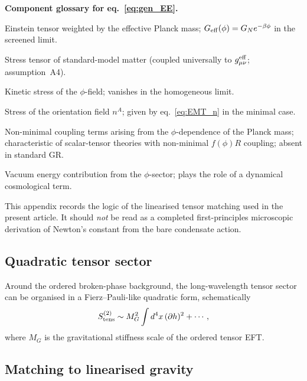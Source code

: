 \documentclass[11pt,a4paper]{article}
\numberwithin{equation}{section}
\begin{document}
\textbf{Component glossary for eq.~\eqref{eq:gen_EE}.}
\begin{description}[noitemsep,leftmargin=2.5em]
  \item[$M^2_{\rm eff}(\phi)G_{\mu\nu}$] Einstein tensor weighted by the
    effective Planck mass; $G_{\rm eff}(\phi)=G_N e^{-\beta\phi}$ in the screened limit.
  \item[$T^{\rm mat}_{\mu\nu}$] Stress tensor of standard-model matter
    (coupled universally to $g^{\rm eff}_{\mu\nu}$; assumption~A4).
  \item[$T^{(\phi)}_{\mu\nu}$] Kinetic stress of the $\phi$-field;
    vanishes in the homogeneous limit.
  \item[$T^{(n)}_{\mu\nu}$] Stress of the orientation field $n^A$;
    given by eq.~\eqref{eq:EMT_n} in the minimal case.
  \item[$\nabla_\mu\nabla_\nu M^2_{\rm eff} - g_{\mu\nu}\Box M^2_{\rm eff}$]
    Non-minimal coupling terms arising from the $\phi$-dependence of
    the Planck mass; characteristic of scalar-tensor theories with
    non-minimal $f(\phi)R$ coupling; absent in standard GR.
  \item[$-U(\phi)g_{\mu\nu}$] Vacuum energy contribution from the
    $\phi$-sector; plays the role of a dynamical cosmological term.
\end{description}

\label{app:GN_derivation}

This appendix records the logic of the linearised tensor matching used
in the present article.
It should \emph{not} be read as a completed first-principles
microscopic derivation of Newton's constant from the bare condensate
action.

\subsection{Quadratic tensor sector}

Around the ordered broken-phase background, the long-wavelength tensor
sector can be organised in a Fierz--Pauli-like quadratic form,
schematically
\begin{equation}
  S_{\rm tens}^{(2)}
  \sim
  M_G^2 \int d^4x\,(\partial h)^2 + \cdots,
\end{equation}
where $M_G$ is the gravitational stiffness scale of the ordered tensor
EFT.

\subsection{Matching to linearised gravity}
\end{document}
